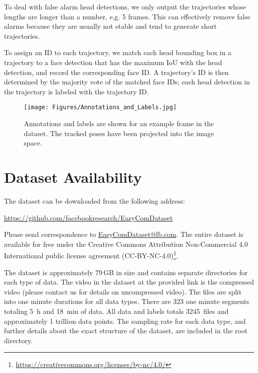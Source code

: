 \documentclass[journal]{IEEEtran}
\newcommand{\DOWNLOADURL}{https://github.com/facebookresearch/EasyComDataset}
\begin{document}
To deal with false alarm head detections, we only output the trajectories
whose lengths are longer than a number, e,g. 5 frames. This can effectively
remove false alarms because they are usually not stable and tend to
generate short trajectories.

To assign an ID to each trajectory, we match each head bounding box in a trajectory to a face detection that has the maximum IoU with the head detection, and record the corresponding face ID. 
A trajectory's ID is then determined by the majority vote of the matched face IDs; each head detection in the trajectory is labeled with the trajectory ID.


\begin{figure}
    \centering
    \texttt{[image: Figures/Annotations\_and\_Labels.jpg]}
    \caption{
        Annotations and labels are shown for an example frame in the dataset.
        The tracked poses have been projected into the image space.}
    \label{fig:annotations_and_labels}
\end{figure}
 \section{Dataset Availability} \label{sec:Availability}

The dataset can be downloaded from the following address:
\begin{center}
\begin{minipage}{1.0\columnwidth}
\url{\DOWNLOADURL}
\end{minipage}
\end{center}
Please send correspondence to {\href{mailto:EasyComDataset@fb.com}{EasyComDataset@fb.com}}.
The entire dataset is available for free under the Creative Commons Attribution Non-Commercial 4.0 International public license agreement (CC-BY-NC-4.0)\footnote{\url{https://creativecommons.org/licenses/by-nc/4.0/}}.

The dataset is approximately 79\,GB in size and contains separate directories for each type of data.
The video in the dataset at the provided link is the compressed video (please contact us for details on uncompressed video).
The files are split into one minute durations for all data types.
There are 323 one minute segments totaling \SI{5}{\hour} and \SI{18}{\minute} of data.
All data and labels totals \SI{3245}{files} and approximately 1 trillion data points.
The sampling rate for each data type, and further details about the exact structure of the dataset, are included in the root directory.
\end{document}
